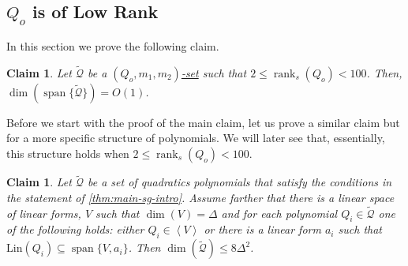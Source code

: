 \documentclass[10pt,a4paper]{article}
\newtheorem{claim}[theorem]{Claim}
\def\rank{\operatorname{rank}}
\newcommand{\cQ}{{\mathcal{Q}}}
\newcommand{\ideal}[1]{\left \langle{#1}\right \rangle}
\newcommand{\spn}[1]{\operatorname{span}\{{#1}\}}
\newcommand{\rkq}{100}
\newcommand{\MS}{\text{Lin}}
\begin{document}
\subsection{$Q_o$ is of Low Rank}
















In this section we prove the following claim.

\begin{claim}\label{cla:strong-Q-dom-lr-main}
Let $\tilde{\cQ}$ be a \hyperref[def:Q-dom]{$(Q_o,m_1,m_2)$-set} such that $2\leq \rank_s(Q_o)< \rkq$.
Then, $\dim(\spn{\tilde{\cQ}}) = O(1)$.
\end{claim}

Before we start with the proof of the main claim, let us prove a similar claim but for a more specific structure of polynomials. We will later see that, essentially, this structure holds when $2\leq \rank_s(Q_o)< \rkq$.

\begin{claim}\label{cla:V-li}
	Let $\tilde{\cQ}$ be a set of quadratics polynomials that satisfy the conditions in the statement of \autoref{thm:main-sg-intro}. Assume farther that there is a linear space of linear forms, $V$ such that $\dim(V)=\Delta$ and for each polynomial $Q_i \in \tilde{\cQ}$ one of the following holds: either $Q_i \in \ideal{V}$ or there is a linear form $a_i$ such that $\MS(Q_i) \subseteq \spn{V,a_i}$. Then $\dim(\tilde{\cQ}) \leq 8\Delta^2 $.
\end{claim}
\end{document}
